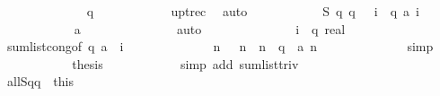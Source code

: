 \begin{isabellebody}
\ \ \ \ \ \ \ \ \ \ \isamarkupfalse%
\ {\isacharbackquoteopen}{}\ {\isasymle}\ q{\isacharbackquoteclose}\isanewline
\ \ \ \ \ \ \ \ \ \ \isamarkupfalse%
\ upt{\isacharunderscore}rec\ \isamarkupfalse%
\ auto\isanewline
\ \ \ \ \ \ \ \ \isamarkupfalse%
\ \isamarkupfalse%
\ {\isachardoublequoteopen}{\isacharquery}S\ q\ q\ {\isacharequal}\ {\isacharparenleft}{\isasymSum}\ i\ {\isasymleftarrow}\ {\isacharbrackleft}{}{\isachardot}{\isachardot}{\isacharless}q{\isacharbrackright}{\isachardot}\ a\ i{\isacharparenright}{\isachardoublequoteclose}\isanewline
\ \ \ \ \ \ \ \ \ \ \isamarkupfalse%
\ {\isacharbackquoteopen}a\ {}\ {\isacharequal}\ {}{\isacharbackquoteclose}\isanewline
\ \ \ \ \ \ \ \ \ \ \isamarkupfalse%
\ auto\isanewline
\ \ \ \ \ \ \ \ \isamarkupfalse%
\ \isamarkupfalse%
\ {\isachardoublequoteopen}{\isachardot}{\isachardot}{\isachardot}\ {\isacharequal}\ {\isacharparenleft}{\isasymSum}\ i\ {\isasymleftarrow}\ {\isacharbrackleft}{}{\isachardot}{\isachardot}{\isacharless}q{\isacharbrackright}{\isachardot}\ {}{\isacharcolon}{\isacharcolon}real{\isacharparenright}{\isachardoublequoteclose}\isanewline
\ \ \ \ \ \ \ \ \ \ \isamarkupfalse%
\ sum{\isacharunderscore}list{\isacharunderscore}cong{\isacharbrackleft}of\ {\isachardoublequoteopen}{\isacharbrackleft}{}{\isachardot}{\isachardot}{\isacharless}q{\isacharbrackright}{\isachardoublequoteclose}\ a\ {\isachardoublequoteopen}{\isasymlambda}\ i{\isachardot}\ {}{\isachardoublequoteclose}{\isacharbrackright}\isanewline
\ \ \ \ \ \ \ \ \ \ \isamarkupfalse%
\ {\isacharbackquoteopen}{\isasymforall}\ n{\isachardot}\ {}\ {\isasymle}\ n\ {\isasymand}\ n\ {\isacharless}\ q\ {\isasymlongrightarrow}\ a\ n\ {\isacharequal}\ {}{\isacharbackquoteclose}\isanewline
\ \ \ \ \ \ \ \ \ \ \isamarkupfalse%
\ simp\isanewline
\ \ \ \ \ \ \ \ \isamarkupfalse%
\ \isamarkupfalse%
\ {\isacharquery}thesis\isanewline
\ \ \ \ \ \ \ \ \ \ \isamarkupfalse%
\ {\isacharparenleft}simp\ add{\isacharcolon}\ sum{\isacharunderscore}list{\isacharunderscore}triv{\isacharparenright}\isanewline
\ \ \ \ \ \ \isamarkupfalse%
\isanewline
\ \ \ \ \isacommand{{\isacharbraceright}}\isamarkupfalse%
\ \isamarkupfalse%
\ all{\isacharunderscore}{}{\isacharunderscore}Sqq\ {\isacharequal}\ this\isanewline

\end{isabellebody}
